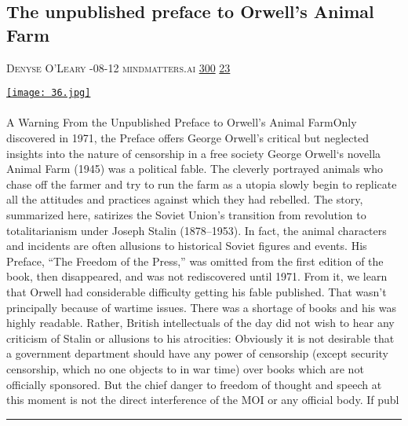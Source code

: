 \documentclass[10pt,a4paper]{article}
\begin{document}
\begin{multicols}{2}
\begin{minipage}{\linewidth}
\subsection{The unpublished preface to Orwell’s Animal Farm}
\textsc{\footnotesize
{\scriptsize\faUser}\space 
Denyse O'Leary 
{\scriptsize\faCalendar}-08-12 
{\scriptsize\faGlobe}\space 
mindmatters.ai 
{\scriptsize\faThumbsOUp}\space 
\href{http://news.ycombinator.com/item?id=37129768\&utm\_term=comment}{300} 
{\scriptsize\faComments}\space 
\href{http://news.ycombinator.com/item?id=37129768\&utm\_term=comment}{23} 
}
\par\medskip\noindent
\href{https://mindmatters.ai/2023/08/a-warning-from-the-unpublished-preface-to-orwells-animal-farm/?utm\_source=hackernewsletter\&utm\_medium=email\&utm\_term=books}{
    \texttt{[image: 36.jpg]}
}
\end{minipage}
\paragraph{}
A Warning From the Unpublished Preface to Orwell’s Animal FarmOnly discovered in 1971, the Preface offers George Orwell’s critical but neglected insights into the nature of censorship in a free society
George Orwell‘s novella Animal Farm (1945) was a political fable. The cleverly portrayed animals who chase off the farmer and try to run the farm as a utopia slowly begin to replicate all the attitudes and practices against which they had rebelled. The story, summarized here, satirizes the Soviet Union’s transition from revolution to totalitarianism under Joseph Stalin (1878–1953). In fact, the animal characters and incidents are often allusions to historical Soviet figures and events.
His Preface, “The Freedom of the Press,” was omitted from the first edition of the book, then disappeared, and was not rediscovered until 1971. From it, we learn that Orwell had considerable difficulty getting his fable published. That wasn’t principally because of wartime issues. There was a shortage of books and his was highly readable. Rather, British intellectuals of the day did not wish to hear any criticism of Stalin or allusions to his atrocities:
Obviously it is not desirable that a government department should have any power of censorship (except security censorship, which no one objects to in war time) over books which are not officially sponsored. But the chief danger to freedom of thought and speech at this moment is not the direct interference of the MOI or any official body. If publ
\par\noindent\textcolor{red}{\rule{\linewidth}{0.2mm}}
\vfill
\null
\noindent\begin{minipage}{\linewidth}

\end{minipage}
\end{multicols}
\end{document}
